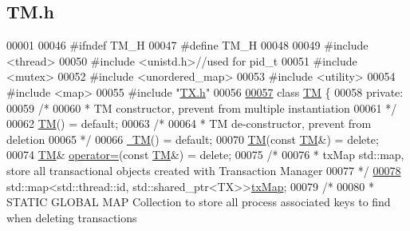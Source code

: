 \hypertarget{_t_m_8h_source}{}\subsection{T\+M.\+h}

\begin{DoxyCode}
00001 
00046 \textcolor{preprocessor}{#ifndef TM\_H}
00047 \textcolor{preprocessor}{#define TM\_H}
00048 
00049 \textcolor{preprocessor}{#include <thread>}
00050 \textcolor{preprocessor}{#include <unistd.h>}\textcolor{comment}{//used for pid\_t}
00051 \textcolor{preprocessor}{#include <mutex>}
00052 \textcolor{preprocessor}{#include <unordered\_map>}
00053 \textcolor{preprocessor}{#include <utility>}
00054 \textcolor{preprocessor}{#include <map>}
00055 \textcolor{preprocessor}{#include "\hyperlink{_t_x_8h}{TX.h}"}
00056 
\hypertarget{_t_m_8h_source.tex_l00057}{}\hyperlink{class_t_m}{00057} \textcolor{keyword}{class }\hyperlink{class_t_m}{TM} \{
00058 \textcolor{keyword}{private}:
00059     \textcolor{comment}{/*}
00060 \textcolor{comment}{     * TM constructor, prevent from multiple instantiation}
00061 \textcolor{comment}{     */}
00062     \hyperlink{class_t_m_a9b5afb6b9d7c5925ab5cc5c65078ac23_a9b5afb6b9d7c5925ab5cc5c65078ac23}{TM}() = \textcolor{keywordflow}{default}; 
00063     \textcolor{comment}{/*}
00064 \textcolor{comment}{     * TM de-constructor, prevent from deletion}
00065 \textcolor{comment}{     */}
00066     \hyperlink{class_t_m_a985f8cb24f685925ddd637c7030cd2b3_a985f8cb24f685925ddd637c7030cd2b3}{~TM}() = \textcolor{keywordflow}{default};
00070     \hyperlink{class_t_m_a9b5afb6b9d7c5925ab5cc5c65078ac23_a9b5afb6b9d7c5925ab5cc5c65078ac23}{TM}(\textcolor{keyword}{const} \hyperlink{class_t_m}{TM}&) = \textcolor{keyword}{delete}; 
00074     \hyperlink{class_t_m}{TM}& \hyperlink{class_t_m_a85a6b783f0566f0877bab6a7de977c0a_a85a6b783f0566f0877bab6a7de977c0a}{operator=}(\textcolor{keyword}{const} \hyperlink{class_t_m}{TM}&) = \textcolor{keyword}{delete}; 
00075     \textcolor{comment}{/*}
00076 \textcolor{comment}{     * txMap std::map, store all transactional objects created with Transaction Manager}
00077 \textcolor{comment}{     */}
\hypertarget{_t_m_8h_source.tex_l00078}{}\hyperlink{class_t_m_a0333dfa193ea99d7626de74a2b932e9b_a0333dfa193ea99d7626de74a2b932e9b}{00078}     std::map<std::thread::id, std::shared\_ptr<TX>>\hyperlink{class_t_m_a0333dfa193ea99d7626de74a2b932e9b_a0333dfa193ea99d7626de74a2b932e9b}{txMap};
00079     \textcolor{comment}{/*}
00080 \textcolor{comment}{     * STATIC GLOBAL MAP Collection to store all process associated keys to find when deleting transactions
}
\end{DoxyCode}
